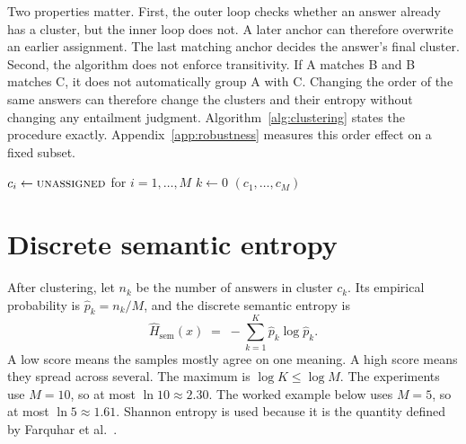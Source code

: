 Two properties matter. First, the outer loop checks whether an answer already
has a cluster, but the inner loop does not. A later anchor can therefore
overwrite an earlier assignment. The last matching anchor decides the
answer's final cluster. Second, the algorithm does not enforce transitivity. If A matches B and B
matches C, it does not automatically group A with C. Changing the order of the
same answers can therefore change the clusters and their entropy without
changing any entailment judgment. Algorithm~\ref{alg:clustering} states the
procedure exactly.
Appendix~\ref{app:robustness} measures this order effect on a fixed subset.

\begin{algorithm}[htb]
\caption{Bidirectional-entailment clustering by order-dependent anchor scan,
  reproducing \texttt{get\_semantic\_ids} in the released
  code~\cite{kossen_semantic_uncertainty_code_2024}.}
\label{alg:clustering}
$c_i \gets \textsc{unassigned}$ for $i=1,\ldots,M$\;
$k \gets 0$
\Return $(c_1,\ldots,c_M)$\;
\end{algorithm}

\section{Discrete semantic entropy}
\label{sec:discrete-se}

After clustering, let $n_k$ be the number of answers in cluster $c_k$. Its
empirical probability is $\hat{p}_k = n_k/M$, and the discrete semantic entropy
is
\[
  \widehat{H}_{\mathrm{sem}}(x)
  \;=\; -\sum_{k=1}^{K} \hat{p}_k \log \hat{p}_k .
\]
A low score means the samples mostly agree on one meaning. A high score means
they spread across several. The maximum is $\log K \le \log M$. The experiments
use $M=10$, so at most $\ln 10 \approx 2.30$. The worked example below uses
$M=5$, so at most $\ln 5 \approx 1.61$. Shannon entropy is used because it is the quantity defined by Farquhar et
al.~\cite{semantic_entropy_nature_2024}.

